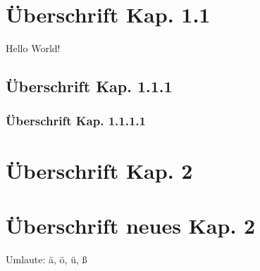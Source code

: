 \documentclass{article}
\begin{document}
\tableofcontents


\section{Überschrift Kap. 1.1}
Hello World! \\
\blindtext

\blindtext
\subsection{Überschrift Kap. 1.1.1}
\blindtext
\subsubsection{Überschrift Kap. 1.1.1.1}
\blindtext
\section*{Überschrift Kap. 2}
\blindtext
\section{Überschrift neues Kap. 2}
Umlaute: ä, ö, ü, ß
\blindtext
\end{document}
